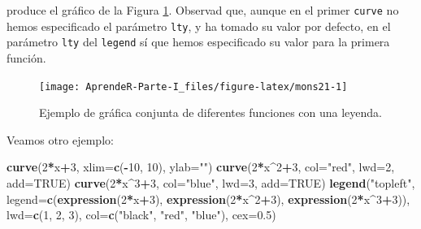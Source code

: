 \documentclass[]{book}
\newenvironment{Shaded}{\begin{snugshade}}{\end{snugshade}}
\newcommand{\DataTypeTok}[1]{\textcolor[rgb]{0.13,0.29,0.53}{#1}}
\newcommand{\DecValTok}[1]{\textcolor[rgb]{0.00,0.00,0.81}{#1}}
\newcommand{\FloatTok}[1]{\textcolor[rgb]{0.00,0.00,0.81}{#1}}
\newcommand{\KeywordTok}[1]{\textcolor[rgb]{0.13,0.29,0.53}{\textbf{#1}}}
\newcommand{\NormalTok}[1]{#1}
\newcommand{\OperatorTok}[1]{\textcolor[rgb]{0.81,0.36,0.00}{\textbf{#1}}}
\newcommand{\OtherTok}[1]{\textcolor[rgb]{0.56,0.35,0.01}{#1}}
\newcommand{\StringTok}[1]{\textcolor[rgb]{0.31,0.60,0.02}{#1}}
\theoremstyle{definition}
\theoremstyle{definition}
\theoremstyle{definition}
\theoremstyle{remark}
\begin{document}
produce el gráfico de la Figura \ref{fig:mons21}. Observad que, aunque en el primer \texttt{curve} no hemos especificado el parámetro \texttt{lty}, y ha tomado su valor por defecto, en el parámetro \texttt{lty} del \texttt{legend} sí que hemos especificado su valor para la primera función.

\begin{figure}

{\centering \texttt{[image: AprendeR-Parte-I\_files/figure-latex/mons21-1]} 

}

\caption{Ejemplo de gráfica conjunta de diferentes funciones con una leyenda.}\label{fig:mons21}
\end{figure}

Veamos otro ejemplo:

\begin{Shaded}
\begin{Highlighting}[]
\KeywordTok{curve}\NormalTok{(}\DecValTok{2}\OperatorTok{*}\NormalTok{x}\OperatorTok{+}\DecValTok{3}\NormalTok{, }\DataTypeTok{xlim=}\KeywordTok{c}\NormalTok{(}\OperatorTok{-}\DecValTok{10}\NormalTok{, }\DecValTok{10}\NormalTok{), }\DataTypeTok{ylab=}\StringTok{""}\NormalTok{)}
\KeywordTok{curve}\NormalTok{(}\DecValTok{2}\OperatorTok{*}\NormalTok{x}\OperatorTok{^}\DecValTok{2}\OperatorTok{+}\DecValTok{3}\NormalTok{, }\DataTypeTok{col=}\StringTok{"red"}\NormalTok{, }\DataTypeTok{lwd=}\DecValTok{2}\NormalTok{, }\DataTypeTok{add=}\OtherTok{TRUE}\NormalTok{)}
\KeywordTok{curve}\NormalTok{(}\DecValTok{2}\OperatorTok{*}\NormalTok{x}\OperatorTok{^}\DecValTok{3}\OperatorTok{+}\DecValTok{3}\NormalTok{, }\DataTypeTok{col=}\StringTok{"blue"}\NormalTok{, }\DataTypeTok{lwd=}\DecValTok{3}\NormalTok{, }\DataTypeTok{add=}\OtherTok{TRUE}\NormalTok{)}
\KeywordTok{legend}\NormalTok{(}\StringTok{"topleft"}\NormalTok{, }\DataTypeTok{legend=}\KeywordTok{c}\NormalTok{(}\KeywordTok{expression}\NormalTok{(}\DecValTok{2}\OperatorTok{*}\NormalTok{x}\OperatorTok{+}\DecValTok{3}\NormalTok{), }\KeywordTok{expression}\NormalTok{(}\DecValTok{2}\OperatorTok{*}\NormalTok{x}\OperatorTok{^}\DecValTok{2}\OperatorTok{+}\DecValTok{3}\NormalTok{), }\KeywordTok{expression}\NormalTok{(}\DecValTok{2}\OperatorTok{*}\NormalTok{x}\OperatorTok{^}\DecValTok{3}\OperatorTok{+}\DecValTok{3}\NormalTok{)), }
       \DataTypeTok{lwd=}\KeywordTok{c}\NormalTok{(}\DecValTok{1}\NormalTok{, }\DecValTok{2}\NormalTok{, }\DecValTok{3}\NormalTok{), }\DataTypeTok{col=}\KeywordTok{c}\NormalTok{(}\StringTok{"black"}\NormalTok{, }\StringTok{"red"}\NormalTok{, }\StringTok{"blue"}\NormalTok{), }\DataTypeTok{cex=}\FloatTok{0.5}\NormalTok{)}
\end{Highlighting}
\end{Shaded}
\end{document}
